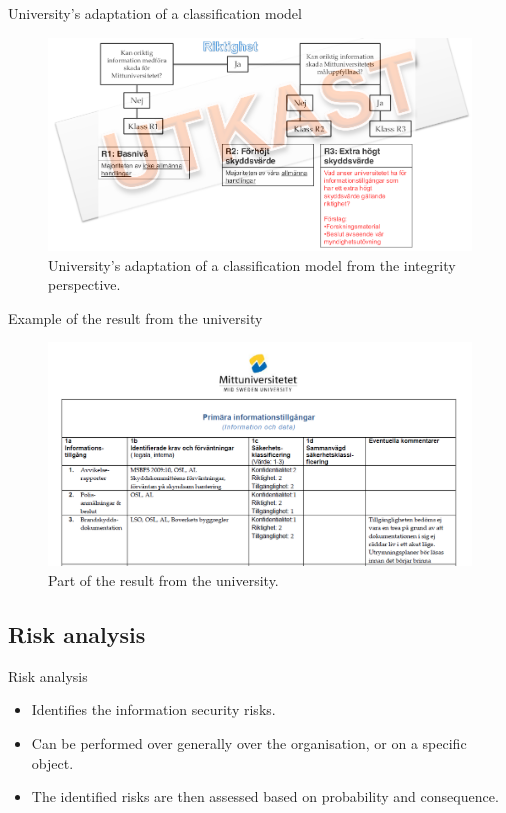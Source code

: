 \documentclass{beamer}
\begin{document}
\begin{frame}{University's adaptation of a classification model}
  \begin{figure}
    \includegraphics[width=\textwidth]{Figures/miun-riktighet.png}
    \caption{University's adaptation of a classification model from the
      integrity perspective.}
  \end{figure}
\end{frame}

\begin{frame}{Example of the result from the university}
  \begin{figure}
    \includegraphics[width=\textwidth]{Figures/miun-klassresultat.png}
    \caption{Part of the result from the university.}
  \end{figure}
\end{frame}

\subsection{Risk analysis}
\begin{frame}{Risk analysis}
  \begin{itemize}
    \item Identifies the information security risks.
    \item Can be performed over generally over the organisation, or on a
      specific object.
    \item The identified risks are then assessed based on probability and
      consequence.
  \end{itemize}
\end{frame}
\end{document}
